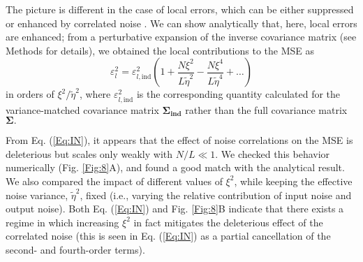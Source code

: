\documentclass[a4paper]{article}%
\begin{document}
The picture is different in the case of local errors, which can be either
suppressed or enhanced by correlated noise \cite[]{daSilveira2021ThePopulations}. We can show analytically that, here, local errors are enhanced; from a
perturbative expansion of the inverse covariance matrix (see Methods for
details), we obtained the local contributions to the MSE as
\begin{equation}
\varepsilon_{l}^{2}=\varepsilon_{l,\text{ind}}^{2}\left(  1+\frac{N\xi^{2}%
}{L\tilde{\eta}^{2}}-\frac{N\xi^{4}}{L\tilde{\eta}^{4}}+\ldots\right)
\label{Eq:IN}%
\end{equation}
in orders of $\xi^{2}/\tilde{\eta}^{2}$, where $\varepsilon_{l,\text{ind}}%
^{2}$ is the corresponding quantity calculated for the variance-matched
covariance matrix $\bm{\Sigma_{\text{ind}}}$ rather than the full covariance matrix
$\bm{\Sigma}.$ 

From Eq. (\ref{Eq:IN}), it appears that the effect of noise correlations on the MSE
is deleterious but scales only weakly with $N/L\ll1$. We checked this behavior
numerically (Fig. \ref{Fig:8}A), and found a good match with the analytical
result. We also compared the impact of different values of $\xi^{2}$, while
keeping the effective noise variance, $\tilde{\eta}^{2}$, fixed (i.e., varying
the relative contribution of input noise and output noise). Both Eq.
(\ref{Eq:IN}) and Fig. \ref{Fig:8}B indicate that there exists a regime in
which increasing $\xi^{2}$ in fact mitigates the deleterious effect of the
correlated noise (this is seen in Eq. (\ref{Eq:IN}) as a partial cancellation
of the second- and fourth-order terms).
\end{document}
